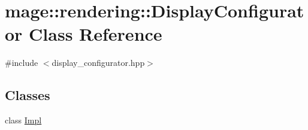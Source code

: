 \hypertarget{classmage_1_1rendering_1_1_display_configurator}{}\section{mage\+:\+:rendering\+:\+:Display\+Configurator Class Reference}
\label{classmage_1_1rendering_1_1_display_configurator}


{\ttfamily \#include $<$display\+\_\+configurator.\+hpp$>$}

\subsection*{Classes}
\begin{DoxyCompactItemize}
\item 
class \mbox{\hyperlink{classmage_1_1rendering_1_1_display_configurator_1_1_impl}{Impl}}
\end{DoxyCompactItemize}
